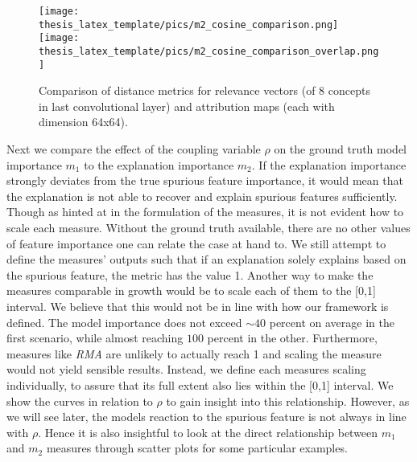\begin{figure}[t!]
    \centering
    \texttt{[image: thesis\_latex\_template/pics/m2\_cosine\_comparison.png]}
    \texttt{[image: thesis\_latex\_template/pics/m2\_cosine\_comparison\_overlap.png]}
    \caption[Relevance Vectors and Attribution Maps, Comparison of Metrics]{Comparison of distance metrics for relevance vectors (of 8 concepts in last convolutional layer) and attribution maps (each with dimension 64x64).}
    \label{fig:m2_cosine_comparison}
\end{figure}

Next we compare the effect of the coupling variable $\rho$ on the ground truth model importance $m_1$ to the explanation importance $m_2$. 
If the explanation importance strongly deviates from the true spurious feature importance, it would mean that the explanation is not able to recover and explain spurious features sufficiently. Though as hinted at in the formulation of the measures, it is not evident how to scale each measure. Without the ground truth available, there are no other values of feature importance one can relate the case at hand to. We still attempt to define the measures' outputs such that if an explanation solely explains based on the spurious feature, the metric has the value 1. 
Another way to make the measures comparable in growth would be to scale each of them to the [0,1] interval. We believe that this would not be in line with how our framework is defined. The model importance does not exceed $\sim 40$ percent on average in the first scenario, while almost reaching $100$ percent in the other. Furthermore, measures like \textit{RMA} are unlikely to actually reach 1 and scaling the measure would not yield sensible results. Instead, we define each measures scaling individually, to assure that its full extent also lies within the [0,1] interval.
We show the curves in relation to $\rho$ to gain insight into this relationship. However, as we will see later, the models reaction to the spurious feature is not always in line with $\rho$. Hence it is also insightful to look at the direct relationship between $m_1$ and $m_2$ measures through scatter plots for some particular examples.

